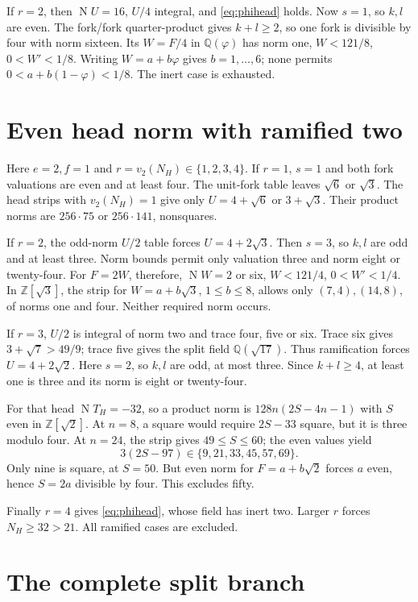 \documentclass[11pt]{article}
\newcommand{\QQ}{\mathbb Q}
\newcommand{\ZZ}{\mathbb Z}
\newcommand{\N}{\operatorname{N}}
\begin{document}
If $r=2$, then $\N U=16$, $U/4$ integral, and
\eqref{eq:phihead} holds. Now $s=1$, so $k,l$ are even.
The fork/fork quarter-product gives $k+l\ge2$,
so one fork is divisible by four with norm sixteen.
Its $W=F/4$ in $\QQ(\varphi)$ has norm one,
$W<121/8$, $0<W'<1/8$.
Writing $W=a+b\varphi$ gives $b=1,\ldots,6$;
none permits $0<a+b(1-\varphi)<1/8$.
The inert case is exhausted.

\section{Even head norm with ramified two}\label{sec:ramified}

Here $e=2,f=1$ and $r=v_2(N_H)\in\{1,2,3,4\}$.
If $r=1$, $s=1$ and both fork valuations are even and at
least four. The unit-fork table leaves $\sqrt6$ or $\sqrt3$.
The head strips with $v_2(N_H)=1$ give only
$U=4+\sqrt6$ or $3+\sqrt3$. Their product norms are
$256\cdot75$ or $256\cdot141$, nonsquares.

If $r=2$, the odd-norm $U/2$ table forces
$U=4+2\sqrt3$. Then $s=3$, so $k,l$ are odd and at least
three. Norm bounds permit only valuation three and norm eight
or twenty-four. For $F=2W$, therefore,
$\N W=2$ or six, $W<121/4$, $0<W'<1/4$.
In $\ZZ[\sqrt3]$, the strip for $W=a+b\sqrt3$,
$1\le b\le8$, allows only $(7,4),(14,8)$, of norms one
and four. Neither required norm occurs.

If $r=3$, $U/2$ is integral of norm two and trace four,
five or six. Trace six gives $3+\sqrt7>49/9$; trace five
gives the split field $\QQ(\sqrt{17})$. Thus ramification forces
$U=4+2\sqrt2$. Here $s=2$, so $k,l$ are odd, at most three.
Since $k+l\ge4$, at least one is three and its norm is eight
or twenty-four.

For that head $\N T_H=-32$, so a product norm is
$128n(2S-4n-1)$ with $S$ even in $\ZZ[\sqrt2]$.
At $n=8$, a square would require $2S-33$ square, but it is
three modulo four. At $n=24$, the strip gives $49\le S\le60$;
the even values yield
\[
 3(2S-97)\in\{9,21,33,45,57,69\}.
\]
Only nine is square, at $S=50$. But even norm for
$F=a+b\sqrt2$ forces $a$ even, hence $S=2a$ divisible
by four. This excludes fifty.

Finally $r=4$ gives \eqref{eq:phihead}, whose field has
inert two. Larger $r$ forces $N_H\ge32>21$.
All ramified cases are excluded.

\section{The complete split branch}\label{sec:split}
\end{document}
